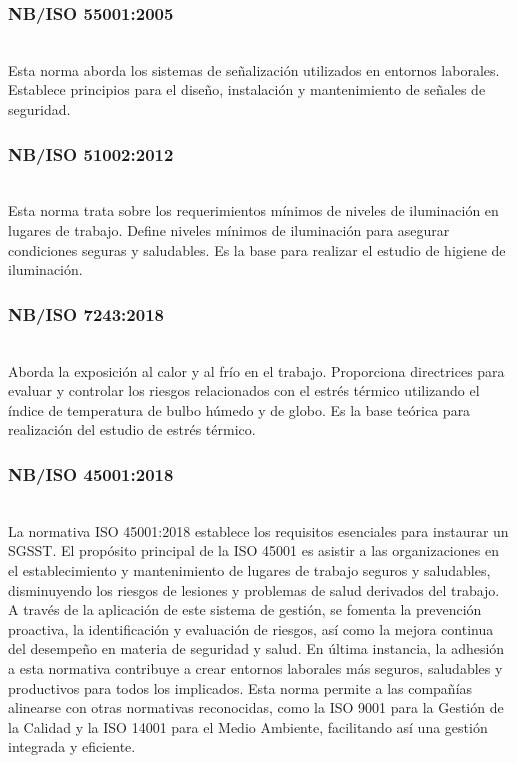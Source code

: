 \subsubsection{NB/ISO 55001:2005}\hfill\\ %
\indent
Esta norma aborda los sistemas de señalización utilizados en entornos laborales. Establece principios para el diseño, instalación y mantenimiento de señales de seguridad.

\subsubsection{NB/ISO 51002:2012}\hfill\\ %
\indent
Esta norma trata sobre los requerimientos mínimos de niveles de iluminación en lugares de trabajo. Define niveles mínimos de iluminación para asegurar condiciones seguras y saludables. Es la base para realizar el estudio de higiene de iluminación.

\subsubsection{NB/ISO 7243:2018}\hfill\\ %
\indent
Aborda la exposición al calor y al frío en el trabajo. Proporciona directrices para evaluar y controlar los riesgos relacionados con el estrés térmico utilizando el índice de temperatura de bulbo húmedo y de globo. Es la base teórica para realización del estudio de estrés térmico.

\subsubsection{NB/ISO 45001:2018}\hfill\\ %
\indent
La normativa ISO 45001:2018 establece los requisitos esenciales para instaurar un SGSST. El propósito principal de la ISO 45001 es asistir a las organizaciones en el establecimiento y mantenimiento de lugares de trabajo seguros y saludables, disminuyendo los riesgos de lesiones y problemas de salud derivados del trabajo. A través de la aplicación de este sistema de gestión, se fomenta la prevención proactiva, la identificación y evaluación de riesgos, así como la mejora continua del desempeño en materia de seguridad y salud. En última instancia, la adhesión a esta normativa contribuye a crear entornos laborales más seguros, saludables y productivos para todos los implicados. Esta norma permite a las compañías alinearse con otras normativas reconocidas, como la ISO 9001 para la Gestión de la Calidad y la ISO 14001 para el Medio Ambiente, facilitando así una gestión integrada y eficiente.

